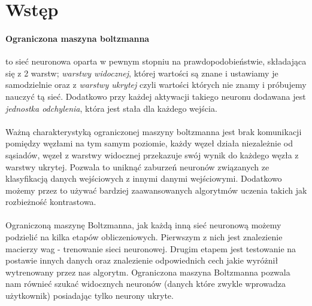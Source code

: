 \section{Wstęp}
    \paragraph{Ograniczona maszyna boltzmanna}
    to sieć neuronowa oparta w pewnym stopniu na prawdopodobieństwie, składająca się z 2 warstw;
    \textit{warstwy widocznej}, której wartości są znane i ustawiamy je samodzielnie oraz z \textit{warstwy ukrytej}
    czyli wartości których nie znamy i próbujemy nauczyć tą sieć. Dodatkowo przy każdej
    aktywacji takiego neuronu dodawana jest \textit{jednostka odchylenia}, która jest
    stała dla każdego wejścia.

    \paragraph{}
        Ważną charakterystyką ograniczonej maszyny boltzmanna jest brak komunikacji pomiędzy węzłami na tym
        samym poziomie, każdy węzeł działa niezależnie od sąsiadów, węzeł z warstwy widocznej
        przekazuje swój wynik do każdego węzła z warstwy ukrytej. Pozwala to uniknąć zaburzeń neuronów związanych
        ze klasyfikacją danych wejściowych z innymi danymi wejściowymi. Dodatkowo możemy przez to używać bardziej
        zaawansowanych algorytmów uczenia takich jak rozbieżność kontrastowa.
    \paragraph{}
	    Ograniczoną maszynę Boltzmanna, jak każdą inną sieć neuronową możemy podzielić na kilka etapów
        obliczeniowych. Pierwszym z nich jest znalezienie macierzy wag - trenowanie sieci neuronowej.
        Drugim etapem jest testowanie na postawie innych danych oraz znalezienie odpowiednich cech jakie
        wyróżnił wytrenowany przez nas algorytm. Ograniczona maszyna Boltzmanna pozwala nam równieć szukać
        widocznych neuronów (danych które zwykle wprowadza użytkownik) posiadając tylko neurony ukryte.